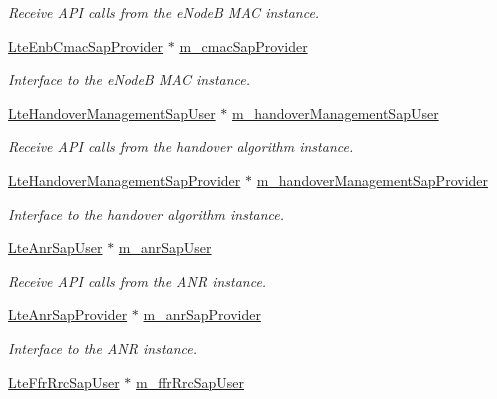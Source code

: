 \begin{DoxyCompactItemize}
\begin{DoxyCompactList}\small\item\em Receive A\+PI calls from the e\+NodeB M\+AC instance. \end{DoxyCompactList}\item 
\hyperlink{classns3_1_1LteEnbCmacSapProvider}{Lte\+Enb\+Cmac\+Sap\+Provider} $\ast$ \hyperlink{classns3_1_1LteEnbRrc_ae5bd011924ef4e221d19d705d6663e8b}{m\+\_\+cmac\+Sap\+Provider}
\begin{DoxyCompactList}\small\item\em Interface to the e\+NodeB M\+AC instance. \end{DoxyCompactList}\item 
\hyperlink{classns3_1_1LteHandoverManagementSapUser}{Lte\+Handover\+Management\+Sap\+User} $\ast$ \hyperlink{classns3_1_1LteEnbRrc_a40201970adca4d2986f20dbd66aea33a}{m\+\_\+handover\+Management\+Sap\+User}
\begin{DoxyCompactList}\small\item\em Receive A\+PI calls from the handover algorithm instance. \end{DoxyCompactList}\item 
\hyperlink{classns3_1_1LteHandoverManagementSapProvider}{Lte\+Handover\+Management\+Sap\+Provider} $\ast$ \hyperlink{classns3_1_1LteEnbRrc_a75cf74c56639713340fa9ae514dcf6d3}{m\+\_\+handover\+Management\+Sap\+Provider}
\begin{DoxyCompactList}\small\item\em Interface to the handover algorithm instance. \end{DoxyCompactList}\item 
\hyperlink{classns3_1_1LteAnrSapUser}{Lte\+Anr\+Sap\+User} $\ast$ \hyperlink{classns3_1_1LteEnbRrc_a73755edf0b4ef491bb008a2c80564c68}{m\+\_\+anr\+Sap\+User}
\begin{DoxyCompactList}\small\item\em Receive A\+PI calls from the A\+NR instance. \end{DoxyCompactList}\item 
\hyperlink{classns3_1_1LteAnrSapProvider}{Lte\+Anr\+Sap\+Provider} $\ast$ \hyperlink{classns3_1_1LteEnbRrc_a8a50cc3ec7f8a766729695ad3f0d6e9c}{m\+\_\+anr\+Sap\+Provider}
\begin{DoxyCompactList}\small\item\em Interface to the A\+NR instance. \end{DoxyCompactList}\item 
\hyperlink{classns3_1_1LteFfrRrcSapUser}{Lte\+Ffr\+Rrc\+Sap\+User} $\ast$ \hyperlink{classns3_1_1LteEnbRrc_a27f4337867e3e886bc1caad3c010698f}{m\+\_\+ffr\+Rrc\+Sap\+User}

\end{DoxyCompactItemize}
